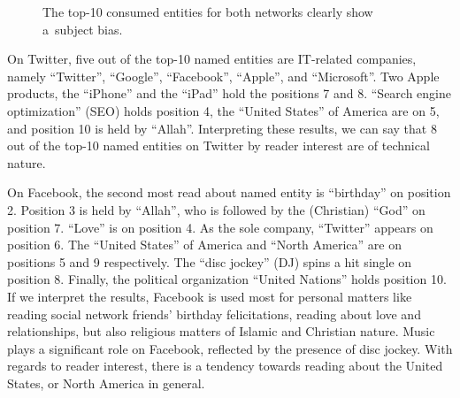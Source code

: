 \documentclass{iosart2c}
\begin{document}
\begin{figure}
  \centering
    \qquad
\caption{The top-10 consumed entities for both networks clearly show a~subject bias.}
\label{fig:top10}
\end{figure}

On Twitter, five out of the top-10 named entities are IT-related companies, namely ``Twitter'', ``Google'', ``Facebook'', ``Apple'', and ``Microsoft''.
Two Apple products, the ``iPhone'' and the ``iPad'' hold the positions 7 and 8.
``Search engine optimization'' (SEO) holds position 4, the ``United States'' of America are on 5, and position 10 is held by ``Allah''.
Interpreting these results, we can say that 8 out of the top-10 named entities on Twitter by reader interest are of technical nature.

On Facebook, the second most read about named entity is ``birthday'' on position 2.
Position 3 is held by ``Allah'', who is followed by the (Christian) ``God'' on position 7.
``Love'' is on position 4.
As the sole company, ``Twitter'' appears on position 6.
The ``United States'' of America and ``North America'' are on positions 5 and 9 respectively.
The ``disc jockey'' (DJ) spins a hit single on position 8.
Finally, the political organization ``United Nations'' holds position 10.
If we interpret the results, Facebook is used most for personal matters like reading social network friends' birthday felicitations, reading about love and relationships, but also religious matters of Islamic and Christian nature.
Music plays a significant role on Facebook, reflected by the presence of disc jockey.
With regards to reader interest, there is a tendency towards reading about the United States, or North America in general.
\end{document}
